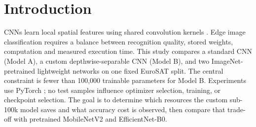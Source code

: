 \section{Introduction}
CNNs learn local spatial features using shared convolution kernels \cite{lecun1998}.
Edge image classification requires a balance between recognition quality,
stored weights, computation and measured execution time. This study compares
a standard CNN (Model A), a custom depthwise-separable CNN (Model B), and two
ImageNet-pretrained lightweight networks on one fixed EuroSAT split. The central
constraint is fewer than 100,000 trainable parameters for Model B.
Experiments use PyTorch \cite{pytorch2019}; no test samples influence optimizer
selection, training, or checkpoint selection. The goal is to determine which
resources the custom sub-100k model saves and what accuracy cost is observed,
then compare that trade-off with pretrained MobileNetV2 and EfficientNet-B0.
